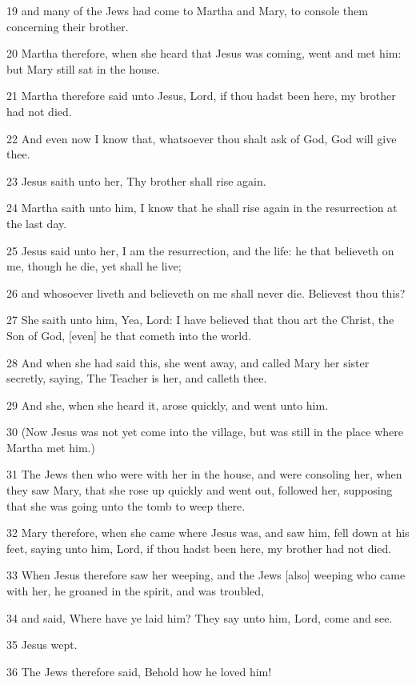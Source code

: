 \par 19 and many of the Jews had come to Martha and Mary, to console them concerning their brother.
\par 20 Martha therefore, when she heard that Jesus was coming, went and met him: but Mary still sat in the house.
\par 21 Martha therefore said unto Jesus, Lord, if thou hadst been here, my brother had not died.
\par 22 And even now I know that, whatsoever thou shalt ask of God, God will give thee.
\par 23 Jesus saith unto her, Thy brother shall rise again.
\par 24 Martha saith unto him, I know that he shall rise again in the resurrection at the last day.
\par 25 Jesus said unto her, I am the resurrection, and the life: he that believeth on me, though he die, yet shall he live;
\par 26 and whosoever liveth and believeth on me shall never die. Believest thou this?
\par 27 She saith unto him, Yea, Lord: I have believed that thou art the Christ, the Son of God, [even] he that cometh into the world.
\par 28 And when she had said this, she went away, and called Mary her sister secretly, saying, The Teacher is her, and calleth thee.
\par 29 And she, when she heard it, arose quickly, and went unto him.
\par 30 (Now Jesus was not yet come into the village, but was still in the place where Martha met him.)
\par 31 The Jews then who were with her in the house, and were consoling her, when they saw Mary, that she rose up quickly and went out, followed her, supposing that she was going unto the tomb to weep there.
\par 32 Mary therefore, when she came where Jesus was, and saw him, fell down at his feet, saying unto him, Lord, if thou hadst been here, my brother had not died.
\par 33 When Jesus therefore saw her weeping, and the Jews [also] weeping who came with her, he groaned in the spirit, and was troubled,
\par 34 and said, Where have ye laid him? They say unto him, Lord, come and see.
\par 35 Jesus wept.
\par 36 The Jews therefore said, Behold how he loved him!
